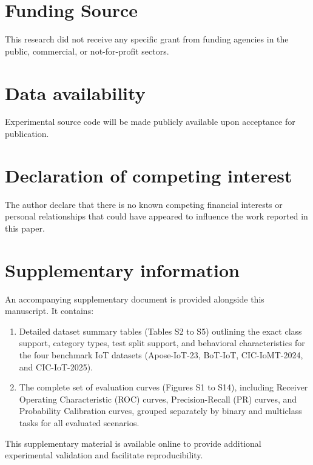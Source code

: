 \documentclass[a4paper,fleqn]{cas-sc}
\begin{document}

\section*{Funding Source}
This research did not receive any specific grant from funding agencies in the public, commercial, or not-for-profit sectors.

\section*{Data availability}
Experimental source code will be made publicly available upon acceptance for publication.

\section*{Declaration of competing interest}
The author declare that there is no known competing financial interests or personal relationships that could have appeared to influence the work reported in this paper.

\section*{Supplementary information}
{\color{blue}An accompanying supplementary document is provided alongside this manuscript. It contains:}
\begin{enumerate}
    \item {\color{blue}Detailed dataset summary tables (Tables S2 to S5) outlining the exact class support, category types, test split support, and behavioral characteristics for the four benchmark IoT datasets (Apose-IoT-23, BoT-IoT, CIC-IoMT-2024, and CIC-IoT-2025).}
    \item {\color{blue}The complete set of evaluation curves (Figures S1 to S14), including Receiver Operating Characteristic (ROC) curves, Precision-Recall (PR) curves, and Probability Calibration curves, grouped separately by binary and multiclass tasks for all evaluated scenarios.}
\end{enumerate}
{\color{blue}This supplementary material is available online to provide additional experimental validation and facilitate reproducibility.}


\printcredits

%





\end{document}
